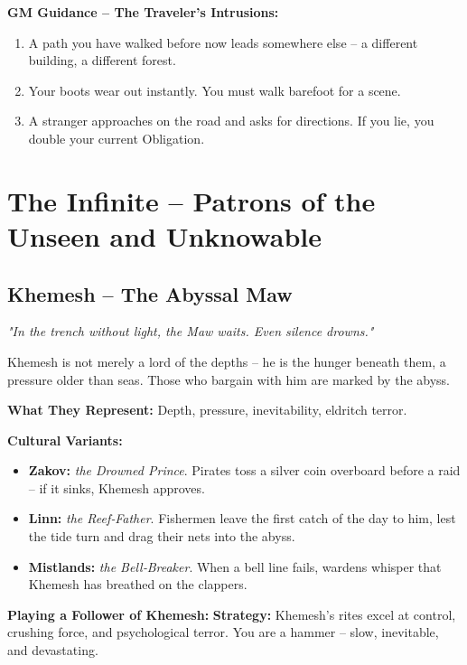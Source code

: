 \documentclass[10pt,a5paper]{book}
\begin{document}
\textbf{GM Guidance -- The Traveler's Intrusions:}
\begin{enumerate}
    \item A path you have walked before now leads somewhere else -- a different building, a different forest.
    \item Your boots wear out instantly. You must walk barefoot for a scene.
    \item A stranger approaches on the road and asks for directions. If you lie, you double your current Obligation.
\end{enumerate}

\clearpage

\section{The Infinite -- Patrons of the Unseen and Unknowable}

\subsection{Khemesh -- The Abyssal Maw}
\label{patron:khemesh}

\textit{"In the trench without light, the Maw waits. Even silence drowns."}

Khemesh is not merely a lord of the depths -- he is the hunger beneath them, a pressure older than seas. Those who bargain with him are marked by the abyss.

\textbf{What They Represent:} Depth, pressure, inevitability, eldritch terror.

\textbf{Cultural Variants:}
\begin{itemize}
    \item \textbf{Zakov:} \textit{the Drowned Prince}. Pirates toss a silver coin overboard before a raid -- if it sinks, Khemesh approves.
    \item \textbf{Linn:} \textit{the Reef‑Father}. Fishermen leave the first catch of the day to him, lest the tide turn and drag their nets into the abyss.
    \item \textbf{Mistlands:} \textit{the Bell‑Breaker}. When a bell line fails, wardens whisper that Khemesh has breathed on the clappers.
\end{itemize}

\textbf{Playing a Follower of Khemesh:}
\textbf{Strategy:} Khemesh's rites excel at control, crushing force, and psychological terror. You are a hammer -- slow, inevitable, and devastating.
\end{document}
